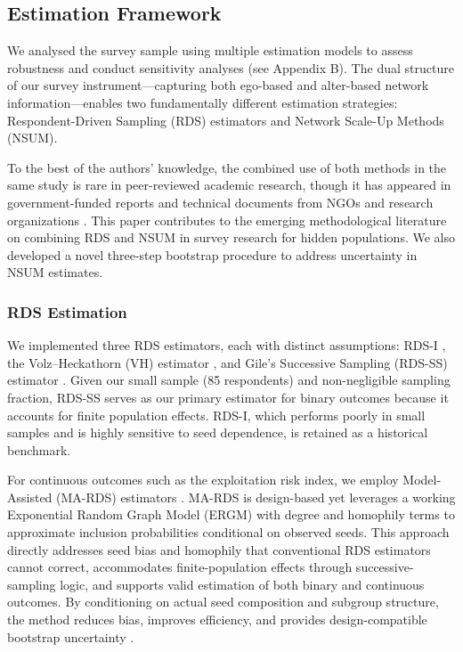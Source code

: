 \documentclass[
  12pt,
  letterpaper,
  DIV=11,
  numbers=noendperiod]{scrartcl}
\theoremstyle{plain}
\theoremstyle{definition}
\begin{document}
\subsection{Estimation Framework}\label{estimation-framework}

We analysed the survey sample using multiple estimation models to assess
robustness and conduct sensitivity analyses (see Appendix B). The dual
structure of our survey instrument---capturing both ego-based and
alter-based network information---enables two fundamentally different
estimation strategies: Respondent-Driven Sampling (RDS) estimators and
Network Scale-Up Methods (NSUM).

To the best of the authors' knowledge, the combined use of both methods
in the same study is rare in peer-reviewed academic research, though it
has appeared in government-funded reports and technical documents from
NGOs and research organizations
\autocite{ist20-prevalence,hick25-human}. This paper contributes to the
emerging methodological literature on combining RDS and NSUM in survey
research for hidden populations. We also developed a novel three-step
bootstrap procedure to address uncertainty in NSUM estimates.

\subsubsection{RDS Estimation}\label{rds-estimation}

We implemented three RDS estimators, each with distinct assumptions:
RDS-I \autocite{salg04-sampling}, the Volz--Heckathorn (VH) estimator
\autocite{volz08-probability}, and Gile's Successive Sampling (RDS-SS)
estimator \autocite{gile11-improved}. Given our small sample (85
respondents) and non-negligible sampling fraction, RDS-SS serves as our
primary estimator for binary outcomes because it accounts for finite
population effects. RDS-I, which performs poorly in small samples and is
highly sensitive to seed dependence, is retained as a historical
benchmark.

For continuous outcomes such as the exploitation risk index, we employ
Model-Assisted (MA-RDS) estimators \autocite{gile15-network}. MA-RDS is
design-based yet leverages a working Exponential Random Graph Model
(ERGM) with degree and homophily terms to approximate inclusion
probabilities conditional on observed seeds. This approach directly
addresses seed bias and homophily that conventional RDS estimators
cannot correct, accommodates finite-population effects through
successive-sampling logic, and supports valid estimation of both binary
and continuous outcomes. By conditioning on actual seed composition and
subgroup structure, the method reduces bias, improves efficiency, and
provides design-compatible bootstrap uncertainty
\autocite{gile11-improved}.
\end{document}
